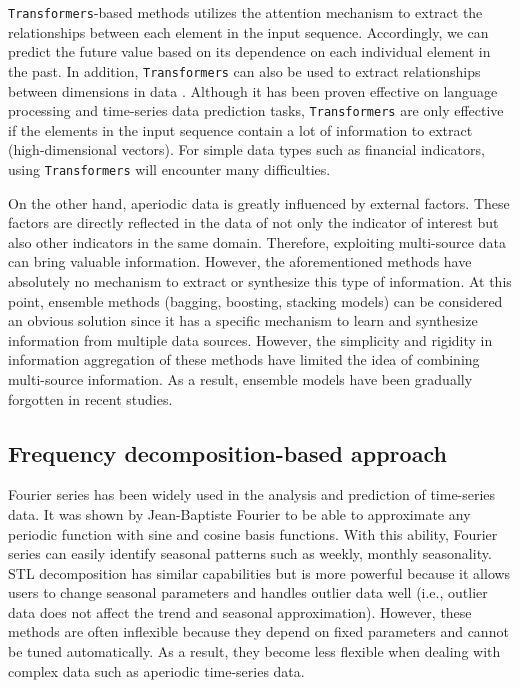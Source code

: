 \documentclass[a4paper,fleqn]{cas-sc}
\begin{document}
\vspace{1mm}

\verb|Transformers|-based methods \cite{chen2021autoformer, zhou2022fedformer} utilizes the attention mechanism to extract the relationships between each element in the input sequence. Accordingly, we can predict the future value based on its dependence on each individual element in the past. In addition, \verb|Transformers| can also be used to extract relationships between dimensions in data \cite{liu2025onsitnet, zhang2023crossformer}. Although it has been proven effective on language processing and time-series data prediction tasks, \verb|Transformers| are only effective if the elements in the input sequence contain a lot of information to extract (high-dimensional vectors). For simple data types such as financial indicators, using \verb|Transformers| will encounter many difficulties.

\vspace{1mm}

On the other hand, aperiodic data is greatly influenced by external factors. These factors are directly reflected in the data of not only the indicator of interest but also other indicators in the same domain. Therefore, exploiting multi-source data can bring valuable information. However, the aforementioned methods have absolutely no mechanism to extract or synthesize this type of information. At this point, ensemble methods (bagging, boosting, stacking models) can be considered an obvious solution since it has a specific mechanism to learn and synthesize information from multiple data sources. However, the simplicity and rigidity in information aggregation of these methods have limited the idea of combining multi-source information. As a result, ensemble models have been gradually forgotten in recent studies.

\subsection{Frequency decomposition-based approach}

Fourier series has been widely used in the analysis and prediction of time-series data. It was shown by Jean-Baptiste Fourier to be able to approximate any periodic function with sine and cosine basis functions. With this ability, Fourier series can easily identify seasonal patterns such as weekly, monthly seasonality. STL decomposition \cite{rb1990stl} has similar capabilities but is more powerful because it allows users to change seasonal parameters and handles outlier data well (i.e., outlier data does not affect the trend and seasonal approximation). However, these methods are often inflexible because they depend on fixed parameters and cannot be tuned automatically. As a result, they become less flexible when dealing with complex data such as aperiodic time-series data.
\end{document}
